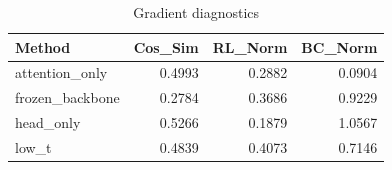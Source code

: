 \begin{table}[htbp]
\centering
\caption{Gradient diagnostics}
\label{tab:grad-diag}
\begin{tabular}{lrrr}
\toprule
\textbf{Method} & \textbf{Cos\_Sim} & \textbf{RL\_Norm} & \textbf{BC\_Norm} \\
\midrule
attention\_only & 0.4993 & 0.2882 & 0.0904 \\
frozen\_backbone & 0.2784 & 0.3686 & 0.9229 \\
head\_only & 0.5266 & 0.1879 & 1.0567 \\
low\_t & 0.4839 & 0.4073 & 0.7146 \\
\bottomrule
\end{tabular}
\end{table}